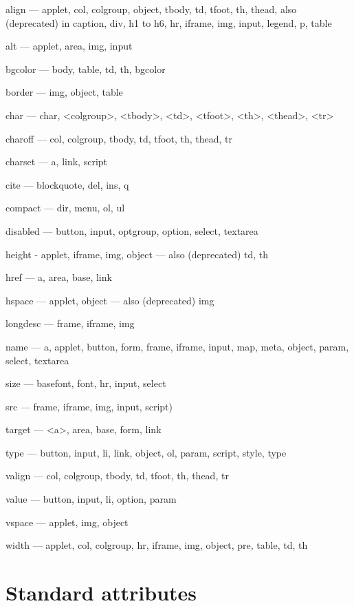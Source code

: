 \begin{compactitem}
\item align — applet, col, colgroup, object, tbody, td, tfoot, th, thead, also (deprecated) in caption, div, h1 to h6, hr, iframe, img, input, legend, p, table
\item alt — applet, area, img, input
\item bgcolor — body, table, td, th, bgcolor
\item border — img, object, table
\item char — char, <colgroup>, <tbody>, <td>, <tfoot>, <th>, <thead>, <tr>
\item charoff — col, colgroup, tbody, td, tfoot, th, thead, tr
\item charset — a, link, script
\item cite — blockquote, del, ins, q
\item compact — dir, menu, ol, ul
\item disabled — button, input, optgroup, option, select, textarea
\item height - applet, iframe, img, object — also (deprecated) td, th
\item href — a, area, base, link
\item hspace — applet, object — also (deprecated) img
\item longdesc — frame, iframe, img
\item name — a, applet, button, form, frame, iframe, input, map, meta, object, param, select, textarea
\item size — basefont, font, hr, input, select
\item src — frame, iframe, img, input, script)
\item target — <a>, area, base, form, link
\item type — button, input, li, link, object, ol, param, script, style, type
\item valign — col, colgroup, tbody, td, tfoot, th, thead, tr
\item value — button, input, li, option, param
\item vspace — applet, img, object
\item width — applet, col, colgroup, hr, iframe, img, object, pre, table, td, th
\end{compactitem}







\chapter{Standard attributes}



